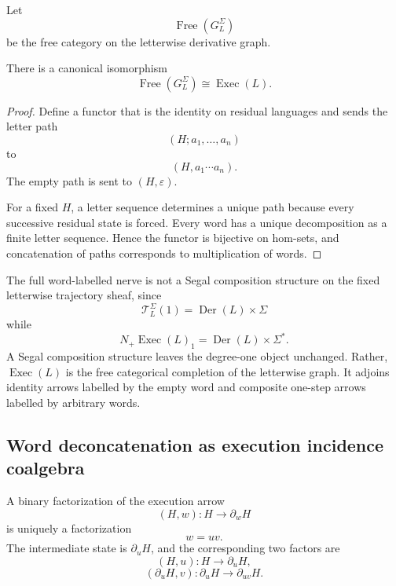 Let
\[
    \operatorname{Free}(G_L^\Sigma)
\]
be the free category on the letterwise derivative graph.

\begin{theorem}
\label{thm:word-execution-free-categorical-completion}
There is a canonical isomorphism
\[
    \operatorname{Free}(G_L^\Sigma)
    \cong
    \operatorname{Exec}(L).
\]
\end{theorem}

\begin{proof}
Define a functor that is the identity on residual languages and sends the
letter path
\[
    (H;a_1,\ldots,a_n)
\]
to
\[
    (H,a_1\cdots a_n).
\]
The empty path is sent to \((H,\varepsilon)\).

For a fixed \(H\), a letter sequence determines a unique path because every
successive residual state is forced. Every word has a unique decomposition
as a finite letter sequence. Hence the functor is bijective on hom-sets, and
concatenation of paths corresponds to multiplication of words.
\end{proof}

\begin{remark}
\label{rem:letterwise-paths-not-segal-closed}
The full word-labelled nerve is not a Segal composition structure on the
fixed letterwise trajectory sheaf, since
\[
    \mathscr T_L^\Sigma(1)
    =
    \operatorname{Der}(L)\times\Sigma
\]
while
\[
    N_+\operatorname{Exec}(L)_1
    =
    \operatorname{Der}(L)\times\Sigma^\ast.
\]
A Segal composition structure leaves the degree-one object unchanged.
Rather, \(\operatorname{Exec}(L)\) is the free categorical completion of the
letterwise graph. It adjoins identity arrows labelled by the empty word and
composite one-step arrows labelled by arbitrary words.
\end{remark}

\subsection{Word deconcatenation as execution incidence coalgebra}
\label{subsec:word-deconcatenation-incidence}

A binary factorization of the execution arrow
\[
    (H,w):H\to\partial_wH
\]
is uniquely a factorization
\[
    w=uv.
\]
The intermediate state is \(\partial_uH\), and the corresponding two factors
are
\[
    (H,u):H\to\partial_uH,
\]
\[
    (\partial_uH,v):
    \partial_uH\to\partial_{uv}H.
\]

